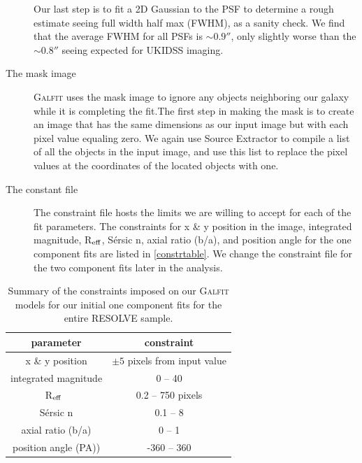 \documentclass[iop,apj]{emulateapj}
\newcommand{\Reff}{R$_{\rm eff}$}
\begin{document}
\begin{description}
{\begin{enumerate}
\end{enumerate}

\noindent Our last step is to fit a 2D Gaussian to the PSF to determine a rough estimate seeing full width half max (FWHM), as a sanity check. We find that the average FWHM for all PSFs is $\sim 0.9''$, only slightly worse than the $\sim 0.8''$ seeing expected for UKIDSS imaging.}

\item[The mask image]{\textsc{Galfit} uses the mask image to ignore any objects neighboring our galaxy while it is completing the fit.The first step in making the mask is to create an image that has the same dimensions as our input image but with each pixel value equaling zero. We again use Source Extractor to compile a list of all the objects in the input image, and  use this list to replace the pixel values at the coordinates of the located objects with one.}

\item[The constant file]{The constraint file hosts the limits we are willing to accept for each of the fit parameters. The constraints for x \& y position in the image, integrated magnitude, \Reff, S\'ersic n, axial ratio (b/a), and position angle for the one component fits are listed in \autoref{constrtable}. We change the constraint file for the two component fits later in the analysis.}

\end{description}

\begin{table}[htdp]
\begin{center}
\begin{tabular}{cc} \hline
parameter & constraint  \\ \hline
x \& y position & $\pm5$ pixels from input value \\
integrated magnitude & 0 -- 40 \\ 
\Reff\ & 0.2 -- 750 pixels \\ 
S\'ersic n & 0.1 -- 8 \\ 
axial ratio (b/a) & 0 -- 1 \\
position angle (PA)) & -360 -- 360 \\ \hline
\end{tabular}
\end{center}
\caption{Summary of the constraints imposed on our \textsc{Galfit} models for our initial one component fits for the entire RESOLVE sample.}
\label{constrtable}
\end{table}%
\end{document}
